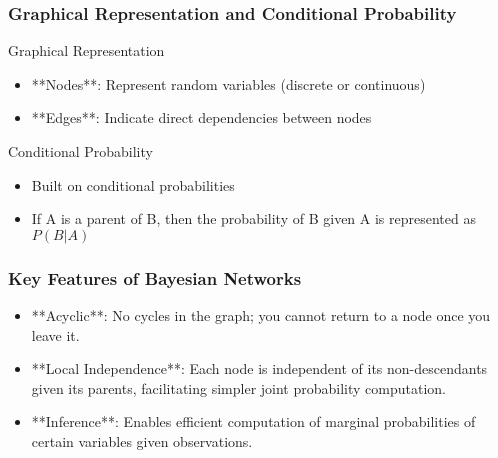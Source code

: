 \documentclass[aspectratio=169]{beamer}
\begin{document}
\begin{frame}[fragile]
    \frametitle{Graphical Representation and Conditional Probability}

    \begin{block}{Graphical Representation}
        \begin{itemize}
            \item **Nodes**: Represent random variables (discrete or continuous)
            \item **Edges**: Indicate direct dependencies between nodes
        \end{itemize}
    \end{block}
    
    \begin{block}{Conditional Probability}
        \begin{itemize}
            \item Built on conditional probabilities
            \item If A is a parent of B, then the probability of B given A is represented as $P(B|A)$
        \end{itemize}
    \end{block}
\end{frame}

\begin{frame}[fragile]
    \frametitle{Key Features of Bayesian Networks}
    
    \begin{itemize}
        \item **Acyclic**: No cycles in the graph; you cannot return to a node once you leave it.
        \item **Local Independence**: Each node is independent of its non-descendants given its parents, facilitating simpler joint probability computation.
        \item **Inference**: Enables efficient computation of marginal probabilities of certain variables given observations.
    \end{itemize}
\end{frame}
\end{document}
